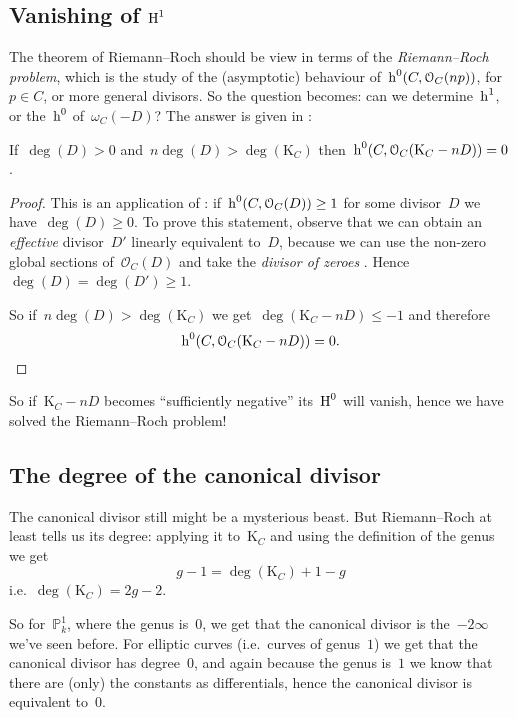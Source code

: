 \subsection{Vanishing of \texorpdfstring{$\operatorname{H}^1$}{first cohomology groups}}
The theorem of Riemann--Roch should be view in terms of the \emph{Riemann--Roch problem}, which is the study of the (asymptotic) behaviour of~$\operatorname{h}^0(C,\mathcal{O}_C(np))$, for~$p\in C$, or more general divisors. So the question becomes: can we determine~$\operatorname{h}^1$, or the~$\operatorname{h}^0$ of~$\omega_C(-D)$? The answer is given in \cite[remark IV.1.3.2]{hartshorne-algebraic-geometry}:
\begin{lemma}
  If~$\deg(D)>0$ and~$n\deg(D)>\deg(\mathrm{K}_C)$ then~$\operatorname{h}^0(C,\mathcal{O}_C(\mathrm{K}_C-nD))=0$.

  \begin{proof}
    This is an application of \cite[lemma IV.1.2]{hartshorne-algebraic-geometry}: if~$\operatorname{h}^0(C,\mathcal{O}_C(D))\geq 1$ for some divisor~$D$ we have~$\deg(D)\geq 0$. To prove this statement, observe that we can obtain an \emph{effective} divisor~$D'$ linearly equivalent to~$D$, because we can use the non-zero global sections of~$\mathcal{O}_C(D)$ and take the \emph{divisor of zeroes} \cite[proposition II.7.7]{hartshorne-algebraic-geometry}. Hence~$\deg(D)=\deg(D')\geq 1$.

    So if~$n\deg(D)>\deg(\mathrm{K}_C)$ we get~$\deg(\mathrm{K}_C-nD)\leq -1$ and therefore
    \begin{equation}
      \operatorname{h}^0(C,\mathcal{O}_C(\mathrm{K}_C-nD))=0.
    \end{equation}
  \end{proof}
\end{lemma}
So if~$\mathrm{K}_C-nD$ becomes ``sufficiently negative'' its~$\operatorname{H}^0$ will vanish, hence we have solved the Riemann--Roch problem!

\subsection{The degree of the canonical divisor}
The canonical divisor still might be a mysterious beast. But Riemann--Roch at least tells us its degree: applying it to~$\mathrm{K}_C$ and using the definition of the genus we get
\begin{equation}
  g-1=\deg(\mathrm{K}_C)+1-g
\end{equation}
i.e.\ $\deg(\mathrm{K}_C)=2g-2$.

So for~$\mathbb{P}_k^1$, where the genus is~$0$, we get that the canonical divisor is the~$-2\infty$ we've seen before. For elliptic curves (i.e.\ curves of genus~$1$) we get that the canonical divisor has degree~$0$, and again because the genus is~$1$ we know that there are (only) the constants as differentials, hence the canonical divisor is equivalent to~$0$.

